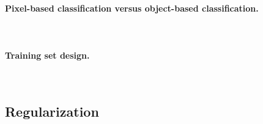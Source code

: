 \paragraph{Pixel-based classification versus object-based classification. \\}~







\paragraph{Training set design. \\}~




\subsection{Regularization}

\stopcontents[chapters]